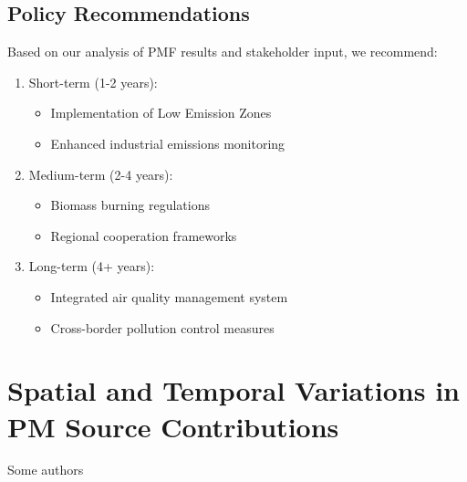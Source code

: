 \documentclass[
  letterpaper,
  oneside,
  openany]{MastersDoctoralThesis}
\providecommand{\tightlist}{%
  \setlength{\itemsep}{0pt}\setlength{\parskip}{0pt}}\usepackage{longtable,booktabs,array}
\theoremstyle{plain}
\theoremstyle{remark}
\begin{document}
\section{Policy Recommendations}\label{policy-recommendations}

Based on our analysis of PMF results and stakeholder input, we
recommend:

\begin{enumerate}
\def\labelenumi{\arabic{enumi}.}
\tightlist
\item
  Short-term (1-2 years):

  \begin{itemize}
  \tightlist
  \item
    Implementation of Low Emission Zones
  \item
    Enhanced industrial emissions monitoring
  \end{itemize}
\item
  Medium-term (2-4 years):

  \begin{itemize}
  \tightlist
  \item
    Biomass burning regulations
  \item
    Regional cooperation frameworks
  \end{itemize}
\item
  Long-term (4+ years):

  \begin{itemize}
  \tightlist
  \item
    Integrated air quality management system
  \item
    Cross-border pollution control measures
  \end{itemize}
\end{enumerate}


\chapter{Spatial and Temporal Variations in PM Source
Contributions}\label{sec-ch4}

\begin{center}
Some authors

\end{center}
\end{document}
